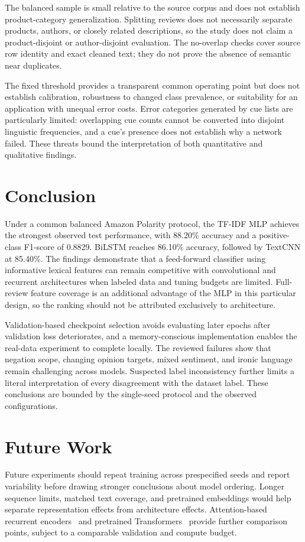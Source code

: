 The balanced sample is small relative to the source corpus and does not establish product-category generalization. Splitting reviews does not necessarily separate products, authors, or closely related descriptions, so the study does not claim a product-disjoint or author-disjoint evaluation. The no-overlap checks cover source row identity and exact cleaned text; they do not prove the absence of semantic near duplicates.

The fixed threshold provides a transparent common operating point but does not establish calibration, robustness to changed class prevalence, or suitability for an application with unequal error costs. Error categories generated by cue lists are particularly limited: overlapping cue counts cannot be converted into disjoint linguistic frequencies, and a cue's presence does not establish why a network failed. These threats bound the interpretation of both quantitative and qualitative findings.


\section{Conclusion}
Under a common balanced Amazon Polarity protocol, the TF-IDF MLP achieves the strongest observed test performance, with 88.20\% accuracy and a positive-class F1-score of 0.8829. BiLSTM reaches 86.10\% accuracy, followed by TextCNN at 85.40\%. The findings demonstrate that a feed-forward classifier using informative lexical features can remain competitive with convolutional and recurrent architectures when labeled data and tuning budgets are limited. Full-review feature coverage is an additional advantage of the MLP in this particular design, so the ranking should not be attributed exclusively to architecture.

Validation-based checkpoint selection avoids evaluating later epochs after validation loss deteriorates, and a memory-conscious implementation enables the real-data experiment to complete locally. The reviewed failures show that negation scope, changing opinion targets, mixed sentiment, and ironic language remain challenging across models. Suspected label inconsistency further limits a literal interpretation of every disagreement with the dataset label. These conclusions are bounded by the single-seed protocol and the observed configurations.

\section{Future Work}
Future experiments should repeat training across prespecified seeds and report variability before drawing stronger conclusions about model ordering. Longer sequence limits, matched text coverage, and pretrained embeddings would help separate representation effects from architecture effects. Attention-based recurrent encoders~\cite{zhou2016} and pretrained Transformers~\cite{vaswani2017,devlin2019} provide further comparison points, subject to a comparable validation and compute budget.

